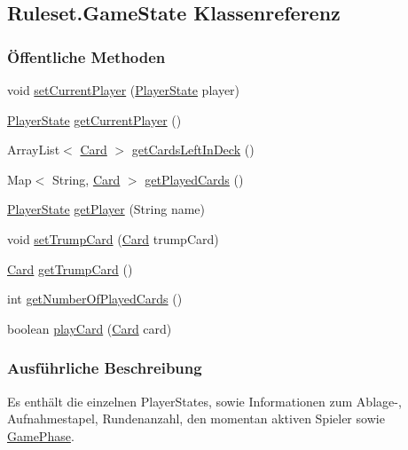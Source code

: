 \hypertarget{a00045}{\subsection{Ruleset.\-Game\-State Klassenreferenz}
\label{a00045}
}
\subsubsection*{Öffentliche Methoden}
\begin{DoxyCompactItemize}
\item 
void \hyperlink{a00045_adcdd80db7006a129d2681ef2156d8030}{set\-Current\-Player} (\hyperlink{a00074}{Player\-State} player)
\item 
\hyperlink{a00074}{Player\-State} \hyperlink{a00045_a940b04c3b7b3e4b2a407b77fa40cce33}{get\-Current\-Player} ()
\item 
Array\-List$<$ \hyperlink{a00002}{Card} $>$ \hyperlink{a00045_acbb1847c191f8642f77c72b971663602}{get\-Cards\-Left\-In\-Deck} ()
\item 
Map$<$ String, \hyperlink{a00002}{Card} $>$ \hyperlink{a00045_a1c3dd6d0e4fd89dd49eb5073c1e06234}{get\-Played\-Cards} ()
\item 
\hyperlink{a00074}{Player\-State} \hyperlink{a00045_aa087b905d7f5b7ac4f7f3356b7d0f06d}{get\-Player} (String name)
\item 
void \hyperlink{a00045_a6cbf9650695639cdbccfc520cc9b112f}{set\-Trump\-Card} (\hyperlink{a00002}{Card} trump\-Card)
\item 
\hyperlink{a00002}{Card} \hyperlink{a00045_a263d6b7805c19249a3a1243379480e87}{get\-Trump\-Card} ()
\item 
int \hyperlink{a00045_afef5de42e97641f5f4f46c2995697502}{get\-Number\-Of\-Played\-Cards} ()
\item 
boolean \hyperlink{a00045_a53e85a9b7f4fe195604de0f1e8a59550}{play\-Card} (\hyperlink{a00002}{Card} card)
\end{DoxyCompactItemize}


\subsubsection{Ausführliche Beschreibung}
Es enthält die einzelnen Player\-States, sowie Informationen zum Ablage-\/, Aufnahmestapel, Rundenanzahl, den momentan aktiven Spieler sowie \hyperlink{a00042}{Game\-Phase}. 

